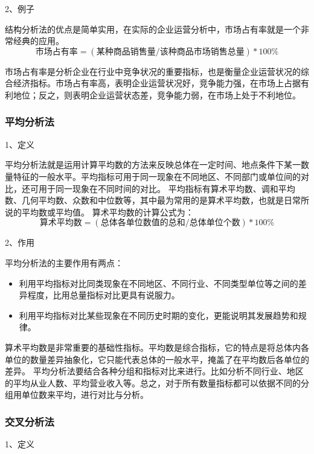 2、例子

结构分析法的优点是简单实用，在实际的企业运营分析中，市场占有率就是一个非常经典的应用。
\begin{equation}
\mbox{市场占有率}=(\mbox{某种商品销售量}/\mbox{该种商品市场销售总量}) * 100 \%
\end{equation}

市场占有率是分析企业在行业中竞争状况的重要指标，也是衡量企业运营状况的综合经济指标。市场占有率高，表明企业运营状况好，竞争能力强，在市场上占据有利地位；反之，则表明企业运营状态差，竞争能力弱，在市场上处于不利地位。

\subsubsection{平均分析法}

1、定义

平均分析法就是运用计算平均数的方法来反映总体在一定时间、地点条件下某一数量特征的一般水平。平均指标可用于同一现象在不同地区、不同部门或单位间的对比，还可用于同一现象在不同时间的对比。
平均指标有算术平均数、调和平均数、几何平均数、众数和中位数等，其中最为常用的是算术平均数，也就是日常所说的平均数或平均值。
算术平均数的计算公式为：
\begin{equation}
\mbox{算术平均数}=(\mbox{总体各单位数值的总和}/\mbox{总体单位个数}) * 100 \%
\end{equation}

2、作用

平均分析法的主要作用有两点：
\begin{itemize}
    \item 利用平均指标对比同类现象在不同地区、不同行业、不同类型单位等之间的差异程度，比用总量指标对比更具有说服力。
    \item 利用平均指标对比某些现象在不同历史时期的变化，更能说明其发展趋势和规律。
\end{itemize}

算术平均数是非常重要的基础性指标。平均数是综合指标，它的特点是将总体内各单位的数量差异抽象化，它只能代表总体的一般水平，掩盖了在平均数后各单位的差异。
平均分析法要结合各种分组和指标对比来进行。比如分析不同行业、地区的平均从业人数、平均营业收入等。总之，对于所有数量指标都可以依据不同的分组用单位数来平均，进行对比与分析。

\subsubsection{交叉分析法}

1、定义

